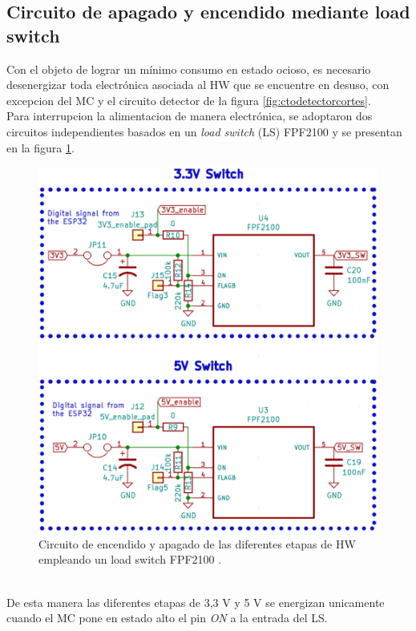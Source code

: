  \subsection{Circuito de apagado y encendido mediante load switch}
 Con el objeto de lograr un mínimo consumo en estado ocioso, es necesario desenergizar toda electrónica asociada al HW que se encuentre en desuso, con excepcion del MC y el circuito detector de la figura \ref{fig:ctodetectorcortes}.\\
 Para interrupcion la alimentacion de manera electrónica, se adoptaron dos circuitos independientes basados en un \textit{load switch} (LS) FPF2100 y se presentan en la figura \ref{fig:ctoloadswitch}.
 \begin{figure}[h]
 	\centering
 	\includegraphics[width=0.7\linewidth]{Figures/cto_load_switch}
 	\caption{Circuito de encendido y apagado de las diferentes etapas de HW empleando un load switch FPF2100 \citep{fpf2100}.}
 	\label{fig:ctoloadswitch}
 \end{figure}\\
De esta manera las diferentes etapas de 3,3 V y 5 V se energizan unicamente cuando el MC pone en estado alto el pin \textit{ON} a la entrada del LS.\\
 
